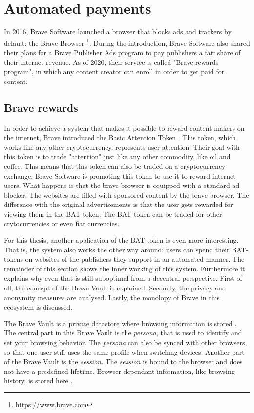 \section{Automated payments}
In 2016, Brave Software launched a browser that blocks ads and trackers by default: the Brave Browser \footnote{\url{https://www.brave.com}}. During the introduction, Brave Software also shared their plans for a Brave Publisher Ads program to pay publishers a fair share of their internet revenue. As of 2020, their service is called "Brave rewards program", in which any content creator can enroll in order to get paid for content. 

\subsection{Brave rewards} 
In order to achieve a system that makes it possible to reward content makers on the internet, Brave introduced the Basic Attention Token \cite{token2018blockchain}. This token, which works like any other cryptocurrency, represents user attention. Their goal with this token is to trade "attention" just like any other commodity, like oil and coffee. This means that this token can also be traded on a cryptocurrency exchange. Brave Software is promoting this token to use it to reward internet users. What happens is that the brave browser is equipped with a standard ad blocker. The websites are filled with sponsored content by the brave browser. The difference with the original advertisements is that the user gets rewarded for viewing them in the BAT-token. The BAT-token can be traded for other crytocurrencies or even fiat currencies. 

For this thesis, another application of the BAT-token is even more interesting. That is, the system also works the other way around: users can spend their BAT-tokens on websites of the publishers they support in an automated manner. The remainder of this section shows the inner working of this system. Furthermore it explains why even that is still suboptimal from a decentral perspective. First of all, the concept of the Brave Vault is explained. Secondly, the privacy and anonymity measures are analysed. Lastly, the monolopy of Brave in this ecosystem is discussed.

The Brave Vault is a private datastore where browsing information is stored \cite{brave-vault}. The central part in this Brave Vault is the \textit{persona}, that is used to identify and set your browsing behavior. The \textit{persona} can also be synced with other browsers, so that one user still uses the same profile when switching devices. Another part of the Brave Vault is the \textit{session}. The \textit{session} is bound to the browser and does not have a predefined lifetime. Browser dependant information, like browsing history, is stored here \cite{brave-vault}.

